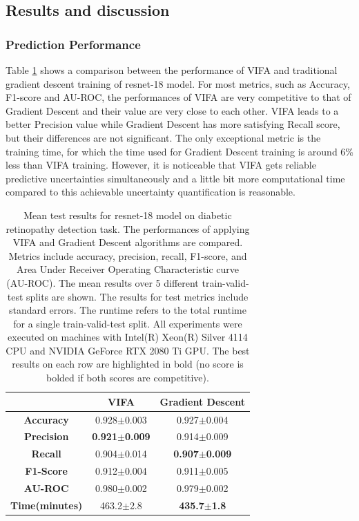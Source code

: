 \documentclass[10pt]{article} %
\begin{document}
\subsection{Results and discussion}

\subsubsection{Prediction Performance}
Table \ref{table: VIFA_GD_comparison} shows a comparison between the performance of VIFA and traditional gradient descent training of resnet-18 model. For most metrics, such as Accuracy, F1-score and AU-ROC, the performances of VIFA are very competitive to that of Gradient Descent and their value are very close to each other. VIFA leads to a better Precision value while Gradient Descent has more satisfying Recall score, but their differences are not significant. The only exceptional metric is the training time, for which the time used for Gradient Descent training is around 6\% less than VIFA training. However, it is noticeable that VIFA gets reliable predictive uncertainties simultaneously and a little bit more computational time compared to this achievable uncertainty quantification is reasonable. 

\begin{table}[!htp]
\caption{Mean test results for resnet-18 model on diabetic retinopathy detection task. The performances of applying VIFA and Gradient Descent algorithms are compared. Metrics include accuracy, precision, recall, F1-score, and Area Under Receiver Operating Characteristic curve (AU-ROC). The mean results over 5 different train-valid-test splits are shown. The results for test metrics include standard errors. The runtime refers to the total runtime for a single train-valid-test split. All experiments were executed on machines with Intel(R) Xeon(R) Silver 4114 CPU and NVIDIA GeForce RTX 2080 Ti GPU. The best results on each row are highlighted in bold (no score is bolded if both scores are competitive).}
\label{table: VIFA_GD_comparison}
\begin{center}
\begin{tabular}{c|c|c}
                   & \textbf{VIFA}        & \textbf{Gradient Descent} \\ \hline
\textbf{Accuracy}  & 0.928$\pm$0.003 & 0.927$\pm$0.004               \\
\textbf{Precision} & \textbf{0.921$\pm$0.009} & 0.914$\pm$0.009               \\
\textbf{Recall}    & 0.904$\pm$0.014 & \textbf{0.907$\pm$0.009}               \\
\textbf{F1-Score}  & 0.912$\pm$0.004 & 0.911$\pm$0.005              \\
\textbf{AU-ROC}    & 0.980$\pm$0.002          & 0.979$\pm$0.002      \\
\textbf{Time(minutes)}      & 463.2$\pm$2.8        & \textbf{435.7$\pm$1.8}   
\end{tabular}
\end{center}
\end{table}
\end{document}
